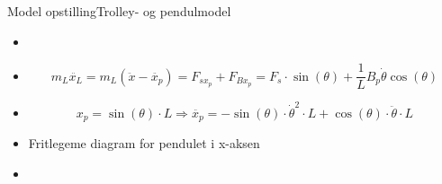 \begin{frame}{Model opstilling}{Trolley- og pendulmodel}
  \begin{minipage}[t]{0.50\linewidth}
    \begin{itemize}
      	\item<1->[] {
              \begin{figure}[H]
              \centering
              \scalebox{0.75}{}
              \end{figure}}
        \item<3->[] {
     		\begin{equation*}
				m_L \ddot{x_L} = m_L(\ddot{x} - \ddot{x_p}) =  F_{sx_p} + F_{Bx_p} = F_s \cdot \sin(\theta) + \frac{1}{L} B_p \dot{\theta} \cos(\theta)
			\end{equation*}} 
		\item<4->[] {
     		\begin{equation*}
				x_p = \sin(\theta) \cdot L \Rightarrow \ddot{x_p} = -\sin(\theta)\cdot \dot{\theta}^2 \cdot L + \cos(\theta)\cdot \ddot{\theta} \cdot L
			\end{equation*}}  	     
    \end{itemize}           
  \end{minipage}
  \begin{minipage}[t]{0.45\linewidth}
\bigskip
\bigskip 
\bigskip
	\begin{itemize}
    	\item<2->[] Fritlegeme diagram for pendulet i x-aksen  
	\end{itemize}    
\medskip 
    \begin{itemize}            
	\item<2->[] {
              \begin{figure}[H]
              \centering
              \scalebox{0.75}{}
              \end{figure}}	     	
    \end{itemize}           
  \end{minipage}
\end{frame} 

